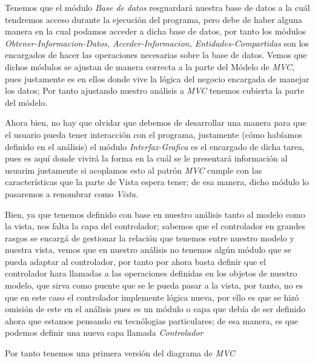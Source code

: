 \documentclass[10pt,letterpaper]{report}
\begin{document}
\vspace{0.2cm}

\noindent Tenemos que el módulo \textit{Base de datos} resguardará nuestra base de datos a la cuál tendremos acceso durante la ejecución del programa, pero debe de haber alguna manera en la cual podamos acceder a dicha base de datos, por tanto los módulos \textit{Obtener-Informacion-Datos, Acceder-Informacion, Entidades-Compartidas} son los encargados de hacer las operaciones necesarias sobre la base de datos. Vemos que dichos módulos se ajustan de manera correcta a la parte del Módelo de \textit{MVC}, pues justamente es en ellos donde vive la lógica del negocio encargada de manejar los datos; Por tanto ajustando nuestro análisis a \textit{MVC} tenemos cubierta la parte del módelo.

\vspace{0.2cm}

\noindent Ahora bien, no hay que olvidar que debemos de desarrollar una manera para que el usuario pueda tener interacción con el programa, justamente (cómo habíamos definido en el análisis) el módulo \textit{Interfaz-Grafica} es el encargado de dicha tarea, pues es aquí donde vivirá la forma en la cuál se le presentará información al usuarim justamente si acoplamos esto al patrón \textit{MVC} cumple con las características que la parte de Vista espera tener; de esa manera, dicho módulo lo pasaremos a renombrar como \textit{Vista}.

\vspace{0.2cm}

\noindent Bien, ya que tenemos definido con base en nuestro análisis tanto al modelo como la vista, nos falta la capa del controlador; sabemos que el controlador en grandes rasgos se encargá de gestionar la relación que tenemos entre nuestro modelo y nuestra vista, vemos que en nuestro análisis no tenemos algún módulo que se pueda adaptar al controlador, por tanto por ahora basta definir que el controlador hara llamadas a las operaciones definidas en los objetos de nuestro modelo, que sirva como puente que se le pueda pasar a la vista, por tanto, no es que en este caso el controlador implemente lógica nueva, por ello es que se hizó omisión de este en el análisis pues es un módulo o capa que debía de ser definido ahora que estamos pensando en tecnólogias particulares; de esa manera, es que podemos definir una nueva capa llamada \textit{Controlador}

\vspace{0.2cm}

\noindent Por tanto tenemos una primera versión del diagrama de \textit{MVC} 
\end{document}
